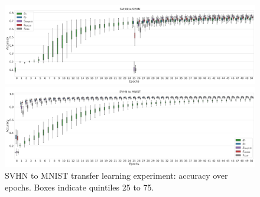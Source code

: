 \begin{figure}[ht!]
\centering
\begin{minipage}[t]{0.42\textwidth}
\begin{center}
\includegraphics[angle=90,origin=c, trim=0in 0in 0in 0in, clip, width=1.00\linewidth]{figures/boxplots/SVHN_to_SVHN_boxplot.png}
\caption{SVHN in-dataset experiment: accuracy over epochs. 
Boxes indicate quintiles 25 to 75. }
\label{fig:sampling_boxplot_svhn_svhn}    
\end{center}
\end{minipage}
\hskip 2mm
\begin{minipage}[t]{0.42\textwidth}
\begin{center}
\includegraphics[angle=90,origin=c, trim=0in 0in 0in 0in, clip, width=1.00\linewidth]{figures/boxplots/SVHN_to_MNIST_boxplot.png}
\caption{SVHN to MNIST transfer learning experiment: accuracy over epochs. Boxes indicate quintiles 25 to 75.}
\label{fig:sampling_boxplot_svhn_mnist}    
\end{center}
\end{minipage}
\hskip 2mm
\end{figure}

\FloatBarrier
\newpage
